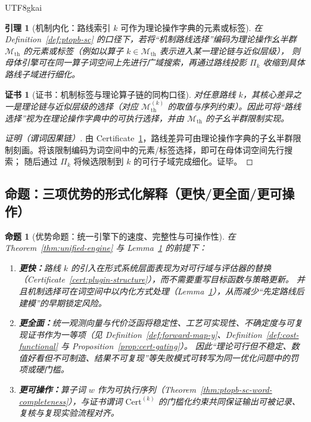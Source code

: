 \documentclass[12pt]{article}
\newtheorem{proposition}{命题}[section]
\newtheorem{lemma}{引理}[section]
\newtheorem{certificate}{证书}[section]
\begin{document}
\begin{CJK*}{UTF8}{gkai}
\begin{lemma}[机制内化：路线索引 $k$ 可作为理论操作字典的元素或标签]
\label{lem:k-in-mth}
在 Definition~\ref{def:ptopb-sc} 的口径下，若将“机制路线选择”编码为理论操作幺半群 $\mathcal{M}_{\mathrm{th}}$ 的元素或标签（例如以算子 $k\in \mathcal{M}
  _{\mathrm{th}}$ 表示进入某一理论链与近似层级），
则母体引擎可在同一算子词空间上先进行广域搜索，再通过路线投影 $\Pi_k$ 收缩到具体路线子域进行细化。
\end{lemma}

\begin{certificate}[证书：机制标签与理论算子链的同构口径]
\label{cert:k-as-theory-operator}
对任意路线 $k$，其核心差异之一是理论链与近似层级的选择（对应 $\mathcal{M}^{(k)}_{\mathrm{th}}$ 的取值与序列约束）。因此可将“路线选择”视为在理论操作字典中的可执行选择，并由 $\mathcal{M}
  _{\mathrm{th}}$ 的子幺半群限制实现。
\end{certificate}

\begin{proof}[证明（谓词因果链）]
由 Certificate~\ref{cert:k-as-theory-operator}，路线差异可由理论操作字典的子幺半群限制刻画。将该限制编码为词空间中的元素/标签选择，即可在母体词空间先行搜索；
随后通过 $\Pi_k$ 将候选限制到 $k$ 的可行子域完成细化。证毕。
\end{proof}

\subsection{命题：三项优势的形式化解释（更快/更全面/更可操作）}

\begin{proposition}[优势命题：统一引擎下的速度、完整性与可操作性]
\label{prop:three-advantages}
在 Theorem~\ref{thm:unified-engine} 与 Lemma~\ref{lem:k-in-mth} 的前提下：
\begin{enumerate}
  \item \textbf{更快：}路线 $k$ 的引入在形式系统层面表现为对可行域与评估器的替换（Certificate~\ref{cert:plugin-structure}），而不需要重写目标函数与策略更新。
  并且机制选择可在词空间中以内化方式处理（Lemma~\ref{lem:k-in-mth}），从而减少“先定路线后建模”的早期锁定风险。
  \item \textbf{更全面：}统一观测向量与代价泛函将稳定性、工艺可实现性、不确定度与可复现证书作为一等项（见 Definition~\ref{def:forward-map-y}、Definition~\ref{def:cost-functional} 与 Proposition~\ref{prop:cert-gating}）。
  因此“理论可行但不稳定、数值好看但不可制造、结果不可复现”等失败模式可转写为同一优化问题中的罚项或硬门槛。
  \item \textbf{更可操作：}算子词 $w$ 作为可执行序列（Theorem~\ref{thm:ptopb-sc-word-completeness}），与证书谓词 $\mathrm{Cert}^{(k)}$
    的门槛化约束共同保证输出可被记录、复核与复现实验流程对齐。
\end{enumerate}
\end{proposition}


\end{CJK*}
\end{document}
